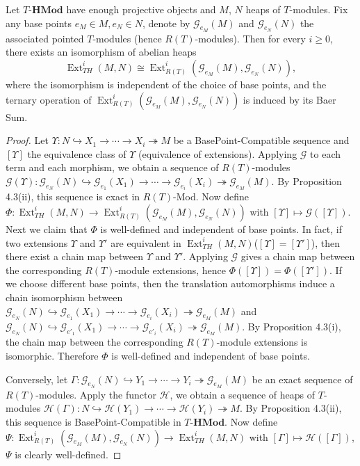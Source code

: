 \documentclass[11pt, twoside]{article}
\begin{document}
\begin{theorem}\rm
Let $T\textbf{-HMod}$ have enough projective objects and $M$, $N$ heaps of $T$-modules. Fix any base points $e_M \in M, e_N \in N$, denote by $\mathcal{G}_{e_M}(M)$ and $\mathcal{G}_{e_N}(N)$ the associated pointed $T$-modules (hence $R(T)$-modules). Then for every $i\geq 0$, there exists an isomorphism of abelian heaps
$$\operatorname{Ext}_{TH}^i(M,N)\cong \operatorname{Ext}_{R(T)}^i(\mathcal{G}_{e_M}(M),\mathcal{G}_{e_N}(N)),$$
where the isomorphism is independent of the choice of base points, and the ternary operation of $\operatorname{Ext}_{R(T)}^i(\mathcal{G}_{e_M}(M),\mathcal{G}_{e_N}(N))$ is induced by its Baer Sum.
\end{theorem}
\begin{proof}
Let $\Upsilon: N \hookrightarrow X_1 \rightarrow \cdots \rightarrow X_i \twoheadrightarrow M$ be a BasePoint-Compatible sequence and $[\Upsilon]$ the equivalence class of $\Upsilon$ (equivalence of extensions). Applying $\mathcal{G}$ to each term and each morphism, we obtain a sequence of $R(T)$-modules $\mathcal{G}(\Upsilon): \mathcal{G}_{e_N}(N) \hookrightarrow \mathcal{G}_{e_1}(X_1) \rightarrow \cdots \rightarrow \mathcal{G}_{e_i}(X_i) \twoheadrightarrow \mathcal{G}_{e_M}(M)$. By Proposition 4.3(ii), this sequence is exact in $R(T)$-Mod. Now define $\Phi :\operatorname{Ext}_{TH}^i(M,N) \rightarrow \operatorname{Ext}_{R(T)}^i(\mathcal{G}_{e_M}(M),\mathcal{G}_{e_N}(N))$ with $[\Upsilon] \mapsto \mathcal{G}([\Upsilon])$. Next we claim that $\Phi$ is well-defined and independent of base points. In fact, if two extensions $\Upsilon$ and $\Upsilon'$ are equivalent in $\operatorname{Ext}_{TH}^i(M,N)$($[\Upsilon]=[\Upsilon']$), then there exist a chain map between $\Upsilon$ and $\Upsilon'$. Applying $\mathcal{G}$ gives a chain map between the corresponding $R(T)$-module extensions, hence $\Phi([\Upsilon])=\Phi([\Upsilon'])$. If we choose different base points, then the translation automorphisms induce a chain isomorphism between $\mathcal{G}_{e_N}(N) \hookrightarrow \mathcal{G}_{e_1}(X_1) \rightarrow \cdots \rightarrow \mathcal{G}_{e_i}(X_i) \twoheadrightarrow \mathcal{G}_{e_M}(M)$ and $\mathcal{G}_{e_N}(N) \hookrightarrow \mathcal{G}_{e'_1}(X_1) \rightarrow \cdots \rightarrow \mathcal{G}_{e'_i}(X_i) \twoheadrightarrow \mathcal{G}_{e_M}(M)$. By Proposition 4.3(i), the chain map between the corresponding $R(T)$-module extensions is isomorphic. Therefore $\Phi$ is well-defined and independent of base points.

Conversely, let $\Gamma : \mathcal{G}_{e_N}(N) \hookrightarrow Y_1 \rightarrow \cdots \rightarrow Y_i \twoheadrightarrow \mathcal{G}_{e_M}(M)$ be an exact sequence of $R(T)$-modules. Apply the functor $\mathcal{H}$, we obtain a sequence of heaps of $T$-modules $\mathcal{H}(\Gamma) : N \hookrightarrow \mathcal{H}(Y_1) \rightarrow \cdots \rightarrow \mathcal{H}(Y_i) \twoheadrightarrow M$. By Proposition 4.3(ii), this sequence is BasePoint-Compatible in $T\textbf{-HMod}$. Now define $\Psi : \operatorname{Ext}_{R(T)}^i(\mathcal{G}_{e_M}(M),\mathcal{G}_{e_N}(N)) \rightarrow \operatorname{Ext}_{TH}^i(M,N)$ with $ [\Gamma] \mapsto \mathcal{H}([\Gamma])$, $\Psi$ is clearly well-defined.


\end{proof}
\end{document}
